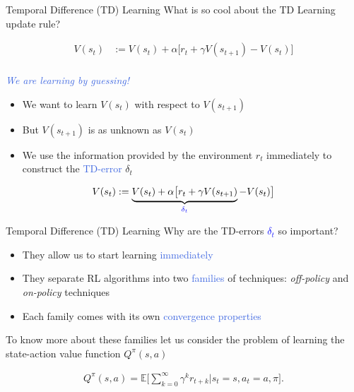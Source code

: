 \documentclass{beamer}
\begin{document}
\begin{frame}{Temporal Difference (TD) Learning}
	What is so cool about the TD Learning update rule?

	\begin{align*}
		V(s_t) & := V(s_t) + \alpha \big[r_t + \gamma V(s_{t+1}) - V(s_t)\big] \\
	\end{align*}

	\begin{center}
	\textcolor{RoyalBlue}{\textit{We are learning by guessing!}}
	\end{center}

	\begin{itemize}
		\item We want to learn $V(s_t)$ with respect to $V(s_{t+1})$
		\item But $V(s_{t+1})$ is as unknown as $V(s_t)$
		\item We use the information provided by the environment $r_t$ immediately to construct the \textcolor{RoyalBlue}{TD-error} $\delta_t$
	\end{itemize}

	\begin{align*}
		V(s_t) & := \underbrace{V(s_t) + \alpha \big[r_t + \gamma V(s_{t+1})}_{\textcolor{blue}{\delta_t}} - V(s_t)\big] \\
	\end{align*}
\end{frame}

\begin{frame}{Temporal Difference (TD) Learning}
	Why are the TD-errors \textcolor{blue}{$\delta_t$} so important?
	\begin{itemize}
		\item They allow us to start learning \textcolor{RoyalBlue}{immediately} 
		\item They separate RL algorithms into two \textcolor{RoyalBlue}{families} of techniques: \textit{off-policy} and \textit{on-policy} techniques
		\item Each family comes with its own \textcolor{RoyalBlue}{convergence properties}
	\end{itemize}

	\bigskip

	To know more about these families let us consider the problem of learning the state-action value function $Q^{\pi}(s,a)$
	
	\begin{align*}
     	Q^{\pi}(s,a)=\mathds{E}\bigg[\sum_{k=0}^{\infty}\gamma^{k}r_{t+k} \bigg| s_t = s, a_t=a, \pi\bigg].
	\end{align*}
\end{frame}
\end{document}

